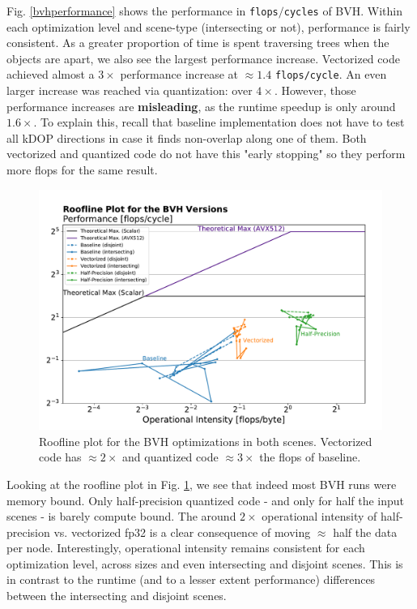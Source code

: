 \documentclass[twocolumn]{article}
\begin{document}
Fig. \ref{bvhperformance} shows the performance in \texttt{flops}$/$\texttt{cycles} of BVH.
Within each optimization level and scene-type (intersecting or not), performance is fairly consistent.
As a greater proportion of time is spent traversing trees when the objects are apart, we also see the largest performance increase.
Vectorized code achieved almost a $3\times$ performance increase at $\approx 1.4$ \texttt{flops/cycle}.
An even larger increase was reached via quantization: over $4\times$.
However, those performance increases are \textbf{misleading}, as the runtime speedup is only around $1.6\times$.
To explain this, recall that baseline implementation does not have to test all kDOP directions in case it finds non-overlap along one of them.
Both vectorized and quantized code do not have this "early stopping" so they perform more flops for the same result.

\begin{figure}[!ht]
\includegraphics[width=1.05\linewidth]{bvh_roofline.pdf}
\caption{Roofline plot for the BVH optimizations in both scenes. Vectorized code has $\approx 2\times$ and quantized code $\approx 3\times$ the flops of baseline.}
\label{bvhroofline}
\end{figure}

Looking at the roofline plot in Fig. \ref{bvhroofline}, we see that indeed most BVH runs were memory bound.
Only half-precision quantized code - and only for half the input scenes - is barely compute bound.
The around $2\times$ operational intensity of half-precision vs. vectorized fp32 is a clear consequence of moving $\approx$ half the data per node.
Interestingly, operational intensity remains consistent for each optimization level, across sizes and even intersecting and disjoint scenes.
This is in contrast to the runtime (and to a lesser extent performance) differences between the intersecting and disjoint scenes.
\end{document}
